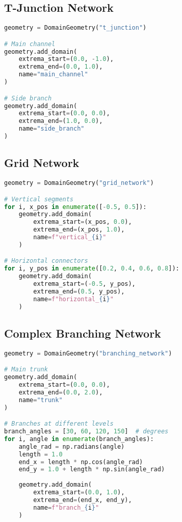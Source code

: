 \documentclass[11pt,a4paper]{article}
\begin{document}
\subsection{T-Junction Network}

\begin{lstlisting}[language=Python, caption={T-Junction Geometry}]
geometry = DomainGeometry("t_junction")

# Main channel
geometry.add_domain(
    extrema_start=(0.0, -1.0),
    extrema_end=(0.0, 1.0),
    name="main_channel"
)

# Side branch
geometry.add_domain(
    extrema_start=(0.0, 0.0),
    extrema_end=(1.0, 0.0),
    name="side_branch"
)
\end{lstlisting}

\subsection{Grid Network}

\begin{lstlisting}[language=Python, caption={Grid Network Geometry}]
geometry = DomainGeometry("grid_network")

# Vertical segments
for i, x_pos in enumerate([-0.5, 0.5]):
    geometry.add_domain(
        extrema_start=(x_pos, 0.0),
        extrema_end=(x_pos, 1.0),
        name=f"vertical_{i}"
    )

# Horizontal connectors
for i, y_pos in enumerate([0.2, 0.4, 0.6, 0.8]):
    geometry.add_domain(
        extrema_start=(-0.5, y_pos),
        extrema_end=(0.5, y_pos),
        name=f"horizontal_{i}"
    )
\end{lstlisting}

\subsection{Complex Branching Network}

\begin{lstlisting}[language=Python, caption={Branching Network Geometry}]
geometry = DomainGeometry("branching_network")

# Main trunk
geometry.add_domain(
    extrema_start=(0.0, 0.0),
    extrema_end=(0.0, 2.0),
    name="trunk"
)

# Branches at different levels
branch_angles = [30, 60, 120, 150]  # degrees
for i, angle in enumerate(branch_angles):
    angle_rad = np.radians(angle)
    length = 1.0
    end_x = length * np.cos(angle_rad)
    end_y = 1.0 + length * np.sin(angle_rad)
    
    geometry.add_domain(
        extrema_start=(0.0, 1.0),
        extrema_end=(end_x, end_y),
        name=f"branch_{i}"
    )
\end{lstlisting}
\end{document}
